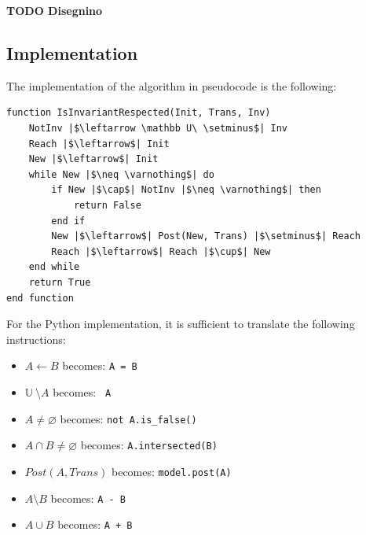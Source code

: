 \documentclass[12pt]{article}
\begin{document}
    \textbf{TODO Disegnino}

    \subsection{Implementation}
    The implementation of the algorithm in pseudocode is the following:

    \begin{verbatim}
function IsInvariantRespected(Init, Trans, Inv)
    NotInv |$\leftarrow \mathbb U\ \setminus$| Inv
    Reach |$\leftarrow$| Init
    New |$\leftarrow$| Init
    while New |$\neq \varnothing$| do
        if New |$\cap$| NotInv |$\neq \varnothing$| then
            return False
        end if
        New |$\leftarrow$| Post(New, Trans) |$\setminus$| Reach
        Reach |$\leftarrow$| Reach |$\cup$| New
    end while
    return True
end function
    \end{verbatim}

    For the Python implementation, it is sufficient to translate the following instructions:
    \begin{itemize}
        \item $A \leftarrow B$ becomes: \texttt{A = B}
        \item $\mathbb U\ \setminus A$ becomes: \texttt{~A}
        \item $A \neq \varnothing$ becomes: \texttt{not A.is_false()}
        \item $A \cap B \neq \varnothing$ becomes: \texttt{A.intersected(B)}
        \item $Post(A, Trans)$ becomes: \texttt{model.post(A)}
        \item $A \setminus B$ becomes: \texttt{A - B}
        \item $A \cup B$ becomes: \texttt{A + B}
    \end{itemize}
\end{document}
